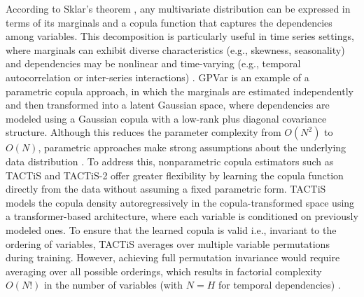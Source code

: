 \documentclass[a4paper,oneside,bibliography=totoc]{scrbook}
\begin{document}
According to Sklar’s theorem \cite{sklar_fonctions_1959}, any multivariate distribution can be expressed in terms of its marginals and a copula function that captures the dependencies among variables. 
This decomposition is particularly useful in time series settings, where marginals can exhibit diverse characteristics (e.g., skewness, seasonality) and dependencies may be nonlinear and time-varying (e.g., temporal autocorrelation or inter-series interactions) \cite{salinas_high-dimensional_2019}. 
GPVar \cite{salinas_high-dimensional_2019} is an example of a parametric copula approach, in which the marginals are estimated independently and then transformed into a latent Gaussian space, where dependencies are modeled using a Gaussian copula with a low-rank plus diagonal covariance structure.
Although this reduces the parameter complexity from $O(N^2)$ to $O(N)$, parametric approaches make strong assumptions about the underlying data distribution \cite{ashok_tactis-2_2023}. 
To address this, nonparametric copula estimators such as TACTiS and TACTiS-2 \cite{drouin_tactis_2022, ashok_tactis-2_2023} offer greater flexibility by learning the copula function directly from the data without assuming a fixed parametric form.
TACTiS \cite{drouin_tactis_2022} models the copula density autoregressively in the copula-transformed space using a transformer-based architecture, where each variable is conditioned on previously modeled ones. 
To ensure that the learned copula is valid i.e., invariant to the ordering of variables, TACTiS averages over multiple variable permutations during training.
However, achieving full permutation invariance would require averaging over all possible orderings, which results in factorial complexity $O(N!)$ in the number of variables (with $N = H$ for temporal dependencies) \cite{ashok_tactis-2_2023}.
\end{document}
